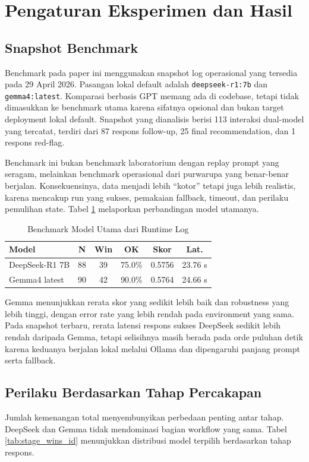 \documentclass[conference]{IEEEtran}
\begin{document}
\section{Pengaturan Eksperimen dan Hasil}
\subsection{Snapshot Benchmark}
Benchmark pada paper ini menggunakan snapshot log operasional yang tersedia pada 29 April 2026. Pasangan lokal default adalah \texttt{deepseek-r1:7b} dan \texttt{gemma4:latest}. Komparasi berbasis GPT memang ada di codebase, tetapi tidak dimasukkan ke benchmark utama karena sifatnya opsional dan bukan target deployment lokal default. Snapshot yang dianalisis berisi 113 interaksi dual-model yang tercatat, terdiri dari 87 respons follow-up, 25 final recommendation, dan 1 respons red-flag.

Benchmark ini bukan benchmark laboratorium dengan replay prompt yang seragam, melainkan benchmark operasional dari purwarupa yang benar-benar berjalan. Konsekuensinya, data menjadi lebih ``kotor'' tetapi juga lebih realistis, karena mencakup run yang sukses, pemakaian fallback, timeout, dan perilaku pemulihan state. Tabel \ref{tab:primary_models_id} melaporkan perbandingan model utamanya.

\begin{table}[t]
\caption{Benchmark Model Utama dari Runtime Log}
\label{tab:primary_models_id}
\centering
\scriptsize
\setlength{\tabcolsep}{2pt}
\begin{tabular}{|p{1.6cm}|c|c|c|c|c|}
\hline
\textbf{Model} & \textbf{N} & \textbf{Win} & \textbf{OK} & \textbf{Skor} & \textbf{Lat.} \\
\hline
DeepSeek-R1 7B & 88 & 39 & 75.0\% & 0.5756 & 23.76 s \\
\hline
Gemma4 latest & 90 & 42 & 90.0\% & 0.5764 & 24.66 s \\
\hline
\end{tabular}
\end{table}

Gemma menunjukkan rerata skor yang sedikit lebih baik dan robustness yang lebih tinggi, dengan error rate yang lebih rendah pada environment yang sama. Pada snapshot terbaru, rerata latensi respons sukses DeepSeek sedikit lebih rendah daripada Gemma, tetapi selisihnya masih berada pada orde puluhan detik karena keduanya berjalan lokal melalui Ollama dan dipengaruhi panjang prompt serta fallback.

\subsection{Perilaku Berdasarkan Tahap Percakapan}
Jumlah kemenangan total menyembunyikan perbedaan penting antar tahap. DeepSeek dan Gemma tidak mendominasi bagian workflow yang sama. Tabel \ref{tab:stage_wins_id} menunjukkan distribusi model terpilih berdasarkan tahap respons.
\end{document}
